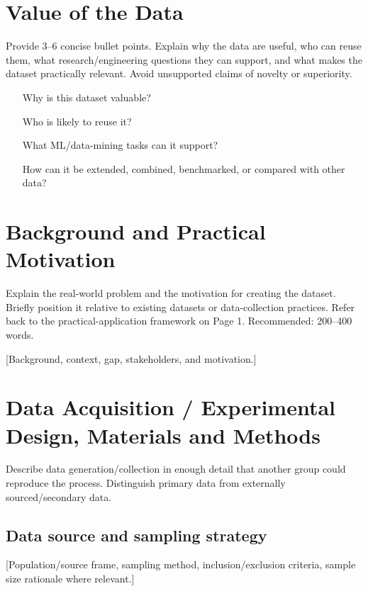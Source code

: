 \documentclass[11pt,a4paper]{article}
\begin{document}
\section{Value of the Data}
Provide 3–6 concise bullet points. Explain why the data are useful, who can reuse them, what research/engineering questions they can support, and what makes the dataset practically relevant. Avoid unsupported claims of novelty or superiority.
\begin{itemize}[leftmargin=1.5em, itemsep=2pt, topsep=2pt]
    \item [Why is this dataset valuable?]
    \item [Who is likely to reuse it?]
    \item [What ML/data-mining tasks can it support?]
    \item [How can it be extended, combined, benchmarked, or compared with other data?]
\end{itemize}

\vspace{1em}

\section{Background and Practical Motivation}
Explain the real-world problem and the motivation for creating the dataset. Briefly position it relative to existing datasets or data-collection practices. Refer back to the practical-application framework on Page 1. Recommended: 200–400 words.

[Background, context, gap, stakeholders, and motivation.]

\vspace{1.5em}

\section{Data Acquisition / Experimental Design, Materials and Methods}
Describe data generation/collection in enough detail that another group could reproduce the process. Distinguish primary data from externally sourced/secondary data.

\subsection{Data source and sampling strategy}
[Population/source frame, sampling method, inclusion/exclusion criteria, sample size rationale where relevant.]
\end{document}
